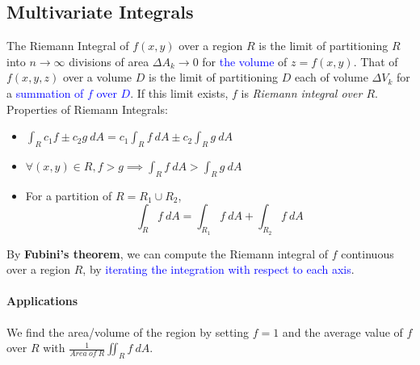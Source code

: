 \subsection{Multivariate Integrals}
The \textcolor{Bittersweet}{Riemann Integral} of $f\left( x,y \right) $ over a
region $R$ is the limit of partitioning $R$ into $n\to \infty$ divisions of
area $\Delta A_k\to 0$ for \textcolor{Blue}{the volume} of $z=f\left( x,y
\right) $.  That of $f\left( x,y,z \right) $ over a volume $D$ is the limit of
partitioning $D$ each of volume $\Delta V_k$ for a \textcolor{Blue}{summation
of $f$ over $D$}.  If this limit exists, $f$ is \textit{Riemann integral over
$R$}.\\
\textcolor{Bittersweet}{Properties} of Riemann Integrals:
\begin{itemize}
  \item $\int_R c_1f \pm c_2g \: d{A}=c_1\int_R f \: d{A}\pm c_2\int_R g \: d{A}$
  \item $\forall \left( x,y \right) \in R, f>g\implies\int_R f \: d{A}>\int_R
    g\: d{A}$
  \item For a partition of $R=R_1\cup R_2$,
    \[\int_R f \: d{A}=\int_{R_1} f \: d{A}+\int_{R_2} f \: d{A}\]
\end{itemize}
By \textbf{Fubini's theorem}, we can compute the Riemann integral of $f$
continuous over a region $R$, by \textcolor{Blue}{iterating the integration
with respect to each axis}.
\paragraph{Applications}
We find the \textcolor{Bittersweet}{area/volume of the region} by setting $f=1$
and the \textcolor{Bittersweet}{average value of $f$ over $R$} with
$\frac{1}{Area\ of\ R}\iint_R f\: d{A}$.\\

